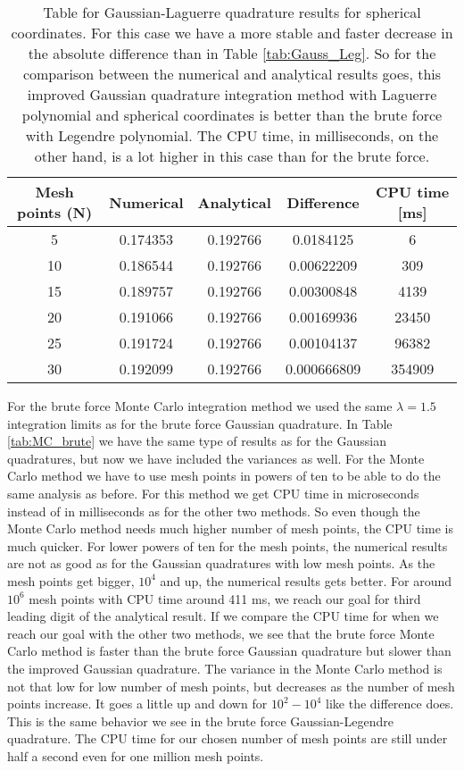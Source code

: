 \documentclass[12pt,a4paper,english]{article}
\begin{document}
\begin{table}[htbp]
	\centering
	\begin{tabular}{ |c|c|c|c|c| }
		\hline \rule{0pt}{13pt}
		Mesh points (N) & Numerical & Analytical & Difference & CPU time [ms]\\
		\hline \rule{0pt}{13pt}
		5 & 0.174353 & 0.192766 & 0.0184125 & 6 \\
		\hline \rule{0pt}{13pt}
		10 & 0.186544 & 0.192766 & 0.00622209 & 309 \\
		\hline \rule{0pt}{13pt}
		15 & 0.189757 & 0.192766 & 0.00300848 & 4139 \\
		\hline \rule{0pt}{13pt}
		20 & 0.191066 & 0.192766 & 0.00169936 & 23450 \\
		\hline \rule{0pt}{13pt}
		25 & 0.191724 & 0.192766 & 0.00104137 & 96382 \\
		\hline \rule{0pt}{13pt}
		30 & 0.192099 & 0.192766 & 0.000666809 & 354909 \\
		\hline 
	\end{tabular}
	\caption{Table for Gaussian-Laguerre quadrature results for spherical coordinates. For this case we have a more stable and faster decrease in the absolute difference than in Table \ref{tab:Gauss_Leg}. So for the comparison between the numerical and analytical results goes, this improved Gaussian quadrature integration method with Laguerre polynomial and spherical coordinates is better than the brute force with Legendre polynomial. The CPU time, in milliseconds, on the other hand, is a lot higher in this case than for the brute force.}
	\label{tab:Gauss_Lag}
\end{table}

For the brute force Monte Carlo integration method we used the same $\lambda=1.5$ integration limits as for the brute force Gaussian quadrature. In Table \ref{tab:MC_brute} we have the same type of results as for the Gaussian quadratures, but now we have included the variances as well. For the Monte Carlo method we have to use mesh points in powers of ten to be able to do the same analysis as before. For this method we get CPU time in microseconds instead of in milliseconds as for the other two methods. So even though the Monte Carlo method needs much higher number of mesh points, the CPU time is much quicker. For lower powers of ten for the mesh points, the numerical results are not as good as for the Gaussian quadratures with low mesh points. As the mesh points get bigger, $10^4$ and up, the numerical results gets better. For around $10^6$ mesh points with CPU time around 411 ms, we reach our goal for third leading digit of the analytical result. If we compare the CPU time for when we reach our goal with the other two methods, we see that the brute force Monte Carlo method is faster than the brute force Gaussian quadrature but slower than the improved Gaussian quadrature. The variance in the Monte Carlo method is not that low for low number of mesh points, but decreases as the number of mesh points increase. It goes a little up and down for $10^2-10^4$ like the difference does. This is the same behavior we see in the brute force Gaussian-Legendre quadrature. The CPU time for our chosen number of mesh points are still under half a second even for one million mesh points.
\end{document}
